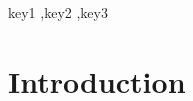 \documentclass[preprint,12pt,authoryear]{elsarticle}
\begin{document}
\begin{frontmatter}
\begin{abstract}
\end{abstract}

\begin{keyword}
key1 \sep  key2 \sep key3 


\end{keyword}

\end{frontmatter}


\section{Introduction}
\end{document}
